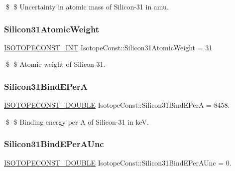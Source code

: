 \$ \$ Uncertainty in atomic mass of Silicon-\/31 in amu. \mbox{\label{group___isotope_const-_silicon-_si31_gaf0cd5484775e6eaf6e11d630e3d2a5df}} 
\subsubsection{\texorpdfstring{Silicon31\+Atomic\+Weight}{Silicon31AtomicWeight}}
{\footnotesize\ttfamily \mbox{\hyperlink{group___isotope_const-_macros_ga5f18360b3e99483a35c32d789e62621c}{I\+S\+O\+T\+O\+P\+E\+C\+O\+N\+S\+T\+\_\+\+I\+NT}} Isotope\+Const\+::\+Silicon31\+Atomic\+Weight = 31}

\$ \$ Atomic weight of Silicon-\/31. \mbox{\label{group___isotope_const-_silicon-_si31_ga372e68f655d92eaa85fa87842f6f6c0a}} 
\subsubsection{\texorpdfstring{Silicon31\+Bind\+E\+PerA}{Silicon31BindEPerA}}
{\footnotesize\ttfamily \mbox{\hyperlink{group___isotope_const-_macros_ga8f45a7272ce02c0b4c65c44636ed719a}{I\+S\+O\+T\+O\+P\+E\+C\+O\+N\+S\+T\+\_\+\+D\+O\+U\+B\+LE}} Isotope\+Const\+::\+Silicon31\+Bind\+E\+PerA = 8458.}

\$ \$ Binding energy per A of Silicon-\/31 in keV. \mbox{\label{group___isotope_const-_silicon-_si31_gaa9ad1bf65b081b69f3e3efdea0d474f0}} 
\subsubsection{\texorpdfstring{Silicon31\+Bind\+E\+Per\+A\+Unc}{Silicon31BindEPerAUnc}}
{\footnotesize\ttfamily \mbox{\hyperlink{group___isotope_const-_macros_ga8f45a7272ce02c0b4c65c44636ed719a}{I\+S\+O\+T\+O\+P\+E\+C\+O\+N\+S\+T\+\_\+\+D\+O\+U\+B\+LE}} Isotope\+Const\+::\+Silicon31\+Bind\+E\+Per\+A\+Unc = 0.}

